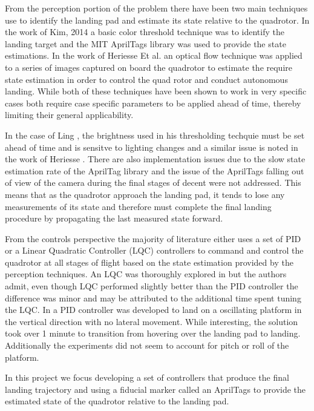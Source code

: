 \documentclass[11pt, twocolumn]{article}
\begin{document}
From the perception portion of the problem there have been two main techniques use to identify the landing pad and estimate its state relative to the quadrotor. In the work of Kim, 2014 \cite{Kim2014} a basic color threshold technique was to identify the landing target and the MIT AprilTags library \cite{apriltags} was used to provide the state estimations. In the work of Heriesse Et al. \cite{Herisse2012} an optical flow technique was applied to a series of images captured on board the quadrotor to estimate the require state estimation in order to control the quad rotor and conduct autonomous landing. While both of these techniques have been shown to work in very specific cases both require case specific parameters to be applied ahead of time, thereby limiting their general applicability. 

In the case of Ling \cite{Kim2014}, the brightness used in his thresholding techquie must be set ahead of time and is sensitve to lighting changes and a similar issue is noted in the work of Heriesse \cite{Herisse2012}. There are also implementation issues due to the slow state estimation rate of the AprilTag library and the issue of the AprilTags falling out of view of the camera during the final stages of decent were not addressed. This means that as the quadrotor approach the landing pad, it tends to lose any measurements of its state and therefore must complete the final landing procedure by propagating the last measured state forward. 

From the controls perspective the majority of literature either uses a set of PID or a Linear Quadratic Controller (LQC) controllers to command and control the quadrotor at all stages of flight based on the state estimation provided by the perception techniques. An LQC was thoroughly explored in \cite{Friis2009} but the authors admit, even though LQC performed slightly better than the PID controller the difference was minor and may be attributed to the additional time spent tuning the LQC. In \cite{Herisse2012} a PID controller was developed to land on a oscillating platform in the vertical direction with no lateral movement. While interesting, the solution took over 1 minute to transition from hovering over the landing pad to landing. Additionally the experiments did not seem to account for pitch or roll of the platform. 

In this project we focus developing a set of controllers that produce the final landing trajectory and using a fiducial marker called an AprilTags \cite{apriltags} to provide the estimated state of the quadrotor relative to the landing pad. 
\end{document}
